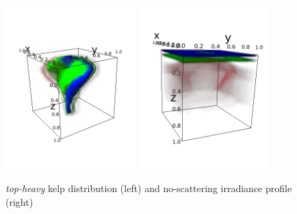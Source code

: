 \documentclass[ms,cpyr,lof,lot]{uathesis}
\begin{document}
\begin{figure}[H]
  \centering
  \vspace{-3em}
  \includegraphics[width=0.45\textwidth]{top-heavy_kelp}
  \includegraphics[width=0.45\textwidth]{top-heavy_irrad}
  \caption{\textit{top-heavy} kelp distribution (left) and no-scattering irradiance profile (right)}
\end{figure}
\end{document}
